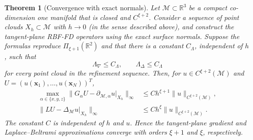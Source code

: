\documentclass[a4paper,fleqn]{cas-sc}
\newtheorem{theorem}{Theorem}
\begin{document}
\begin{theorem}[Convergence with exact normals]
\label{thm:exact-normal-tangent-rbffd}
Let \(\mathcal M\subset\mathbb R^3\) be a compact co-dimension one manifold that is closed and
\(C^{\xi+2}\).  Consider a sequence of point clouds \(X_h\subset\mathcal M\)
with \(h\to0\) (in the sense described above), and construct the tangent-plane RBF-FD operators using the
exact surface normals.  Suppose the formulas reproduce
\(\Pi_{\xi+1}(\mathbb R^2)\) and that there is a constant \(C_\Lambda\),
independent of \(h\), such that
\begin{equation}
  \Lambda_\nabla\leq C_\Lambda,
  \qquad
  \Lambda_\Delta\leq C_\Lambda
  \label{eq:theory-exact-uniform-stability}
\end{equation}
for every point cloud in the refinement sequence.  Then, for
\(u\in C^{\xi+2}(\mathcal M)\) and
\(U=(u(\bm x_1),\ldots,u(\bm x_N))^T\),
\begin{align}
  \max_{\alpha\in\{x,y,z\}}
  \|G_\alpha U-\partial_{\mathcal M,\alpha}u|_{X_h}\|_\infty
  &\leq C h^{\xi+1}\|u\|_{C^{\xi+2}(\mathcal M)},
  \label{eq:exact-normal-global-gradient}\\
  \|LU-\Delta_{\mathcal M}u|_{X_h}\|_\infty
  &\leq C h^\xi\|u\|_{C^{\xi+2}(\mathcal M)}.
  \label{eq:exact-normal-global-laplacian}
\end{align}
The constant \(C\) is independent of \(h\) and \(u\).  Hence the tangent-plane
gradient and Laplace--Beltrami approximations converge with orders
\(\xi+1\) and \(\xi\), respectively.
\end{theorem}
\end{document}
